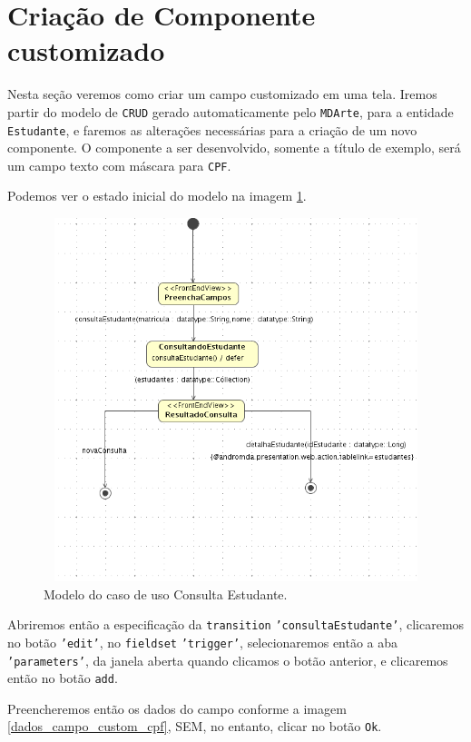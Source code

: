 \section{Criação de Componente customizado}
Nesta seção veremos como criar um campo customizado em uma tela. Iremos partir
do modelo de \texttt{CRUD} gerado automaticamente pelo \texttt{MDArte}, para a
entidade \texttt{Estudante}, e faremos as alterações necessárias para a criação
de um novo componente. O componente a ser desenvolvido, somente a título de
exemplo, será um campo texto com máscara para \texttt{CPF}.

Podemos ver o estado inicial do modelo na imagem
\ref{modelo_consulta_estudante_custom}.
\begin{figure}[H]
	\centering
	\includegraphics[width=350pt,height=300pt]{files/imgs/tutorial-mdarte-0028.png}
	\caption{Modelo do caso de uso Consulta Estudante.}
	\label{modelo_consulta_estudante_custom}
\end{figure}

Abriremos então a especificação da \texttt{transition}
\texttt{'consultaEstudante'}, clicaremos no botão \texttt{'edit'}, no
\texttt{fieldset} \texttt{'trigger'}, selecionaremos então a aba
\texttt{'parameters'}, da janela aberta quando clicamos o botão anterior, e
clicaremos então no botão \texttt{add}.

Preencheremos então os dados do campo conforme a imagem
\ref{dados_campo_custom_cpf}, SEM, no entanto, clicar no botão \texttt{Ok}.

